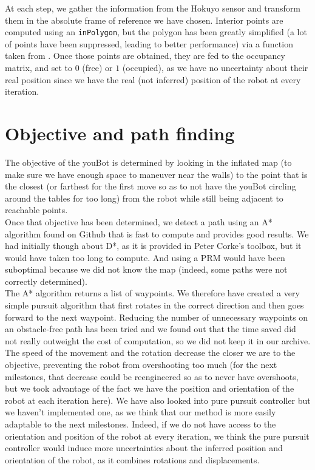 \documentclass[a4paper, 10pt, conference]{ieeeconf}
\begin{document}
    At each step, we gather the information from the Hokuyo sensor and transform them in the absolute frame of reference we have chosen. Interior points are computed using an \texttt{inPolygon}, but the polygon has been greatly simplified (a lot of points have been suppressed, leading to better performance) via a function taken from \cite{youtube_n_scarlata}. Once those points are obtained, they are fed to the occupancy matrix, and set to $0$ (free) or $1$ (occupied), as we have no uncertainty about their real position since we have the real (not inferred) position of the robot at every iteration.\\
    
    \section{Objective and path finding}
    
    The objective of the youBot is determined by looking in the inflated map (to make sure we have enough space to maneuver near the walls) to the point that is the closest (or farthest for the first move so as to not have the youBot circling around the tables for too long) from the robot while still being adjacent to reachable points.\\
    
    Once that objective has been determined, we detect a path using an A* algorithm found on Github \cite{astar_github} that is fast to compute and provides good results. We had initially though about D*, as it is provided in Peter Corke's toolbox, but it would have taken too long to compute. And using a PRM would have been suboptimal because we did not know the map (indeed, some paths were not correctly determined).\\
    
    The A* algorithm returns a list of waypoints. We therefore have created a very simple pursuit algorithm that first rotates in the correct direction and then goes forward to the next waypoint. Reducing the number of unnecessary waypoints on an obstacle-free path has been tried and we found out that the time saved did not really outweight the cost of computation, so we did not keep it in our archive.\newline
    The speed of the movement and the rotation decrease the closer we are to the objective, preventing the robot from overshooting too much (for the next milestones, that decrease could be reengineered so as to never have overshoots, but we took advantage of the fact we have the position and orientation of the robot at each iteration here).\newline
    We have also looked into pure pursuit controller but we haven't implemented one, as we think that our method is more easily adaptable to the next milestones. Indeed, if we do not have access to the orientation and position of the robot at every iteration, we think the pure pursuit controller would induce more uncertainties about the inferred position and orientation of the robot, as it combines rotations and displacements.\\
    
\end{document}
